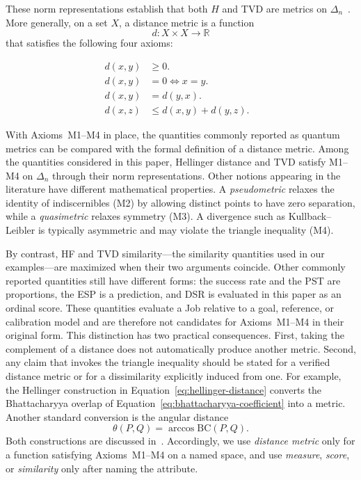\documentclass[10pt,conference]{IEEEtran}
\newcommand{\BC}{\mathrm{BC}}
\begin{document}
These norm representations establish that both $H$ and TVD are metrics on $\Delta_n$~\cite{gilchrist2005,nielsen2010}. More generally, on a set $X$, a distance metric is a function
\begin{equation}
 d\colon X\times X\rightarrow\mathbb{R}
 \label{eq:metric-map}
\end{equation}
that satisfies the following four axioms:

\begin{align}
 d(x,y) &\ge 0. &\tag{M1}\label{eq:metric-nonnegativity}\\
 d(x,y) &= 0\iff x=y. &\tag{M2}\label{eq:metric-identity}\\
 d(x,y) &= d(y,x). &\tag{M3}\label{eq:metric-symmetry}\\
 d(x,z) &\le d(x,y)+d(y,z). &\tag{M4}\label{eq:metric-triangle}
\end{align}

With Axioms~M1--M4 in place, the quantities commonly reported as quantum metrics can be compared with the formal definition of a distance metric. Among the quantities considered in this paper, Hellinger distance and TVD satisfy M1--M4 on $\Delta_n$ through their norm representations. Other notions appearing in the literature have different mathematical properties. A \emph{pseudometric} relaxes the identity of indiscernibles (M2) by allowing distinct points to have zero separation, while a \emph{quasimetric} relaxes symmetry (M3). A divergence such as Kullback--Leibler is typically asymmetric and may violate the triangle inequality (M4).

By contrast, HF and TVD similarity---the similarity quantities used in our examples---are maximized when their two arguments coincide. Other commonly reported quantities still have different forms: the success rate and the PST are proportions, the ESP is a prediction, and DSR is evaluated in this paper as an ordinal score. These quantities evaluate a Job relative to a goal, reference, or calibration model and are therefore not candidates for Axioms~M1--M4 in their original form. This distinction has two practical consequences. First, taking the complement of a distance does not automatically produce another metric. Second, any claim that invokes the triangle inequality should be stated for a verified distance metric or for a dissimilarity explicitly induced from one. For example, the Hellinger construction in Equation~\ref{eq:hellinger-distance} converts the Bhattacharyya overlap of Equation~\ref{eq:bhattacharyya-coefficient} into a metric. Another standard conversion is the angular distance
\begin{equation}
\theta(P,Q)=\arccos\BC(P,Q).
\label{eq:bhattacharyya-angle}
\end{equation}
Both constructions are discussed in~\cite{luo2004,ma2009}. Accordingly, we use \emph{distance metric} only for a function satisfying Axioms~M1--M4 on a named space, and use \emph{measure}, \emph{score}, or \emph{similarity} only after naming the attribute.
\end{document}
